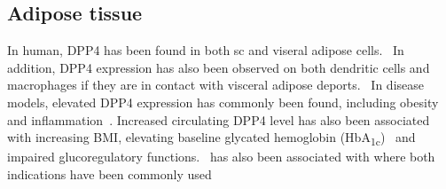\subsection{Adipose tissue}
In human, DPP4 has been found in both sc and viseral adipose cells.~\cite{Lamers2011} In addition, DPP4 expression has also been observed on both dendritic cells and macrophages if they are in contact with visceral adipose deports.~\cite{Zhong2013} In disease models, elevated DPP4 expression has commonly been found, including obesity and inflammation~\cite{Zhong2013}. Increased circulating DPP4 level has also been  associated with increasing BMI, elevating baseline glycated hemoglobin (HbA\textsubscript{1c})~\cite{2011}  and impaired glucoregulatory functions.~\cite{Sell2013}  has also been associated with where both indications have been commonly used 